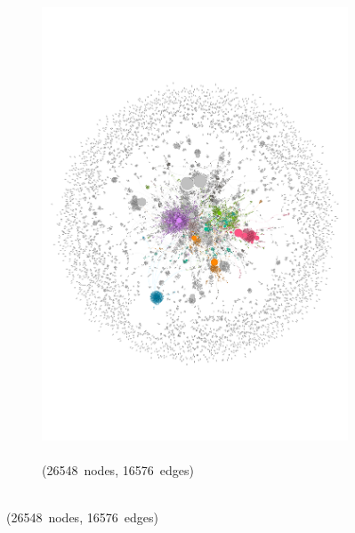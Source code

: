 \documentclass[
  a4paper,
  abstract=on,
  captions=tableabove
  ]{scrartcl}
\begin{document}
\begin{figure}
\begin{subfigure}{.45\linewidth}
        \end{subfigure}
        \begin{subfigure}{.45\linewidth}
          \caption{\\ (\num{26548}~nodes, \num{16576}~edges)}
          \label{subfig:net_last_cases_hyperlocal}
          \includegraphics[width=\linewidth, height=\textheight, keepaspectratio]{img/net_hyperlocal_four.pdf}
        \end{subfigure}


\end{figure}
\end{document}
